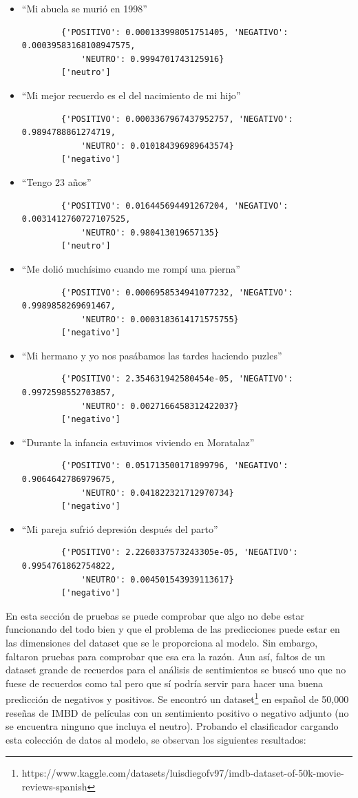 \begin{itemize}
	\item ``Mi abuela se murió en 1998''
	\begin{verbatim}
		{'POSITIVO': 0.000133998051751405, 'NEGATIVO': 0.00039583168108947575,
			'NEUTRO': 0.9994701743125916}
		['neutro']
	\end{verbatim}
	\item ``Mi mejor recuerdo es el del nacimiento de mi hijo''
	\begin{verbatim}
		{'POSITIVO': 0.0003367967437952757, 'NEGATIVO': 0.9894788861274719, 
			'NEUTRO': 0.010184396989643574}
		['negativo']
	\end{verbatim}
	\item ``Tengo 23 años''
	\begin{verbatim}
		{'POSITIVO': 0.016445694491267204, 'NEGATIVO': 0.0031412760727107525, 
			'NEUTRO': 0.980413019657135}
		['neutro']
	\end{verbatim}
	\item ``Me dolió muchísimo cuando me rompí una pierna''
	\begin{verbatim}
		{'POSITIVO': 0.0006958534941077232, 'NEGATIVO': 0.9989858269691467, 
			'NEUTRO': 0.0003183614171575755}
		['negativo']
	\end{verbatim}
	\item ``Mi hermano y yo nos pasábamos las tardes haciendo puzles''
	\begin{verbatim}
		{'POSITIVO': 2.354631942580454e-05, 'NEGATIVO': 0.9972598552703857, 
			'NEUTRO': 0.0027166458312422037}
		['negativo']
	\end{verbatim}
	\item ``Durante la infancia estuvimos viviendo en Moratalaz''
	\begin{verbatim}
		{'POSITIVO': 0.051713500171899796, 'NEGATIVO': 0.9064642786979675, 
			'NEUTRO': 0.041822321712970734}
		['negativo']
	\end{verbatim}
	\item ``Mi pareja sufrió depresión después del parto''
	\begin{verbatim}
		{'POSITIVO': 2.2260337573243305e-05, 'NEGATIVO': 0.9954761862754822, 
			'NEUTRO': 0.004501543939113617}
		['negativo']
	\end{verbatim}
	
\end{itemize}

En esta sección de pruebas se puede comprobar que algo no debe estar funcionando del todo bien y que el problema de las predicciones puede estar en las dimensiones del dataset que se le proporciona al modelo. Sin embargo, faltaron pruebas para comprobar que esa era la razón. Aun así, faltos de un dataset grande de recuerdos para el análisis de sentimientos se buscó uno que no fuese de recuerdos como tal pero que sí podría servir para hacer una buena predicción de negativos y positivos. Se encontró un dataset\footnote{https://www.kaggle.com/datasets/luisdiegofv97/imdb-dataset-of-50k-movie-reviews-spanish} en español de 50,000 reseñas de IMBD de películas con un sentimiento positivo o negativo adjunto (no se encuentra ninguno que incluya el neutro). Probando el clasificador cargando esta colección de datos al modelo, se observan los siguientes resultados: 

